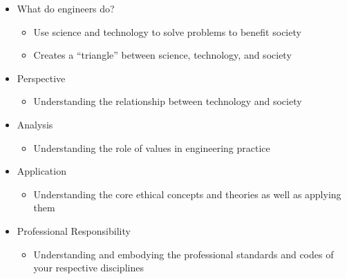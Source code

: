 \begin{itemize}

  \item What do engineers do?

    \begin{itemize}

      \item Use science and technology to solve problems to benefit society

      \item Creates a ``triangle'' between science, technology, and society

    \end{itemize}

  \item Perspective

    \begin{itemize}

      \item Understanding the relationship between technology and society

    \end{itemize}

  \item Analysis

    \begin{itemize}

      \item Understanding the role of values in engineering practice

    \end{itemize}

  \item Application

    \begin{itemize}

      \item Understanding the core ethical concepts and theories as well as applying them

    \end{itemize}

  \item Professional Responsibility

    \begin{itemize}

      \item Understanding and embodying the professional standards and codes of your respective disciplines

    \end{itemize}


\end{itemize}

